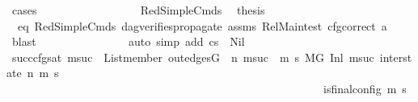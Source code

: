\begin{isabellebody}
\ cases\isanewline
\ \ \ \ \ \ \ \ \ \ \ \ \ \ \ \ \isamarkupfalse%
\ RedSimpleCmds\ \isamarkupfalse%
\ {\isacharquery}{\kern0pt}thesis\ \isamarkupfalse%
\ {}\ eq\ RedSimpleCmds{\isacharparenleft}{\kern0pt}{}{\isacharparenright}{\kern0pt}\ dag{\isacharunderscore}{\kern0pt}verifies{\isacharunderscore}{\kern0pt}propagate\ assms{\isacharparenleft}{\kern0pt}{}{\isacharminus}{\kern0pt}{}{\isacharparenright}{\kern0pt}\ Rel{\isacharunderscore}{\kern0pt}Main{\isacharunderscore}{\kern0pt}test{\isacharparenleft}{\kern0pt}{}{\isacharparenright}{\kern0pt}\ cfg{\isacharunderscore}{\kern0pt}correct\ a{}\ \isamarkupfalse%
\ blast\isanewline
\ \ \ \ \ \ \ \ \ \ \ \ \ \ \isamarkupfalse%
\ {\isacharparenleft}{\kern0pt}auto\ simp\ add{\isacharcolon}{\kern0pt}\ {\isacartoucheopen}cs{}\ {\isasymnoteq}\ Nil{\isacartoucheclose}{\isacharparenright}{\kern0pt}\isanewline
\isanewline
\ \ \ \ \ \ \ \ \ \ \ \ \ \ \isamarkupfalse%
\ succ{\isacharunderscore}{\kern0pt}cfg{\isacharunderscore}{\kern0pt}sat{\isacharcolon}{\kern0pt}\ {\isachardoublequoteopen}{\isacharparenleft}{\kern0pt}{\isasymforall}msuc{}{\isachardot}{\kern0pt}\ \ List{\isachardot}{\kern0pt}member\ {\isacharparenleft}{\kern0pt}out{\isacharunderscore}{\kern0pt}edges{\isacharparenleft}{\kern0pt}G{\isacharparenright}{\kern0pt}\ {\isacharbang}{\kern0pt}\ n{\isacharparenright}{\kern0pt}\ msuc{}\ {\isasymlongrightarrow}\ {\isacharparenleft}{\kern0pt}{\isasymforall}m{\isacharprime}{\kern0pt}\ s{\isacharprime}{\kern0pt}{\isachardot}{\kern0pt}\ {\isacharparenleft}{\kern0pt}{\isacharparenleft}{\kern0pt}M{\isacharcomma}{\kern0pt}{\isasymLambda}{\isacharcomma}{\kern0pt}{\isasymGamma}{\isacharcomma}{\kern0pt}{\isasymOmega}{\isacharcomma}{\kern0pt}G\ {\isasymturnstile}{\isacharparenleft}{\kern0pt}Inl\ {\isacharparenleft}{\kern0pt}msuc{}{\isacharparenright}{\kern0pt}{\isacharcomma}{\kern0pt}\ inter{\isacharunderscore}{\kern0pt}state{\isacharparenright}{\kern0pt}\ {\isacharminus}{\kern0pt}n{\isasymrightarrow}{\isacharasterisk}{\kern0pt}\ {\isacharparenleft}{\kern0pt}m{\isacharprime}{\kern0pt}{\isacharcomma}{\kern0pt}\ s{\isacharprime}{\kern0pt}{\isacharparenright}{\kern0pt}{\isacharparenright}{\kern0pt}\ {\isasymlongrightarrow}\isanewline
\ \ \ \ \ \ \ \ \ \ \ \ \ \ \ \ \ \ \ \ \ \ \ \ \ \ \ \ \ \ \ \ \ \ \ \ \ \ \ \ \ \ \ \ \ \ \ \ \ \ \ \ \ \ \ \ is{\isacharunderscore}{\kern0pt}final{\isacharunderscore}{\kern0pt}config\ {\isacharparenleft}{\kern0pt}m{\isacharprime}{\kern0pt}{\isacharcomma}{\kern0pt}\ s{\isacharprime}{\kern0pt}{\isacharparenright}{\kern0pt}\ {\isasymlongrightarrow}\ \isanewline

\end{isabellebody}
